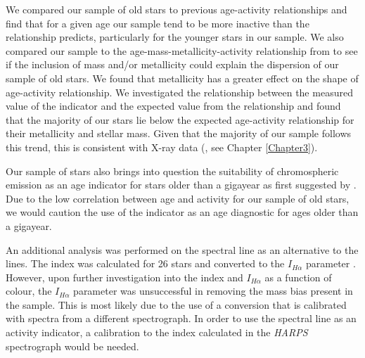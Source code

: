 We compared our sample of old stars to previous age-activity relationships and find that for a given age our sample tend to be more inactive than the relationship predicts, particularly for the younger stars in our sample. We also compared our sample to the age-mass-metallicity-activity relationship from \citet{Lorenzo_Oliveira_etal_2016} to see if the inclusion of mass and/or metallicity could explain the dispersion of our sample of old stars. We found that metallicity has a greater effect on the shape of age-activity relationship. We investigated the relationship between the measured value of the \Rprime indicator and the expected value from the \citet{Lorenzo_Oliveira_etal_2016} relationship and found that the majority of our stars lie below the expected age-activity relationship for their metallicity and stellar mass. Given that the majority of our sample follows this trend, this is consistent with X-ray data (\citealt{Booth_etal_2017}, see Chapter \ref{Chapter3}).

Our sample of stars also brings into question the suitability of chromospheric emission as an age indicator for stars older than a gigayear as first suggested by \citet{Pace_2013}. Due to the low correlation between age and activity for our sample of old stars, we would caution the use of the \Rprime indicator as an age diagnostic for ages older than a gigayear.

An additional analysis was performed on the \Halpha spectral line as an alternative to the \caII lines. The \Halpha index was calculated for 26 stars and converted to the $I_{H\alpha}$ parameter \citep{Gomes_da_Silva_etal_2014}. However, upon further investigation into the \Halpha index and $I_{H\alpha}$ as a function of colour, the $I_{H\alpha}$ parameter was unsuccessful in removing the mass bias present in the sample. This is most likely due to the use of a conversion that is calibrated with spectra from a different spectrograph. In order to use the \Halpha spectral line as an activity indicator, a calibration to the \Halpha index calculated in the \textit{HARPS} spectrograph would be needed.






